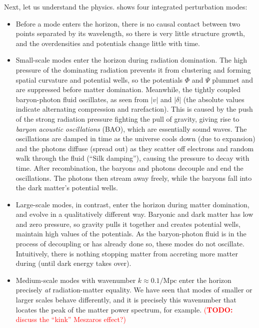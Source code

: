 \documentclass[10pt,a4paper]{article}
\newcommand\TODO[1]{\textcolor{red}{(\textbf{TODO:} #1)}}
\begin{document}
Next, let us understand the physics.
 shows four integrated perturbation modes:
\begin{itemize}
\item
Before a mode enters the horizon,
there is no causal contact between two points separated by its wavelength,
so there is very little structure growth, and the overdensities and potentials change little with time.

\item
Small-scale modes enter the horizon during radiation domination.
The high pressure of the dominating radiation prevents it from clustering and forming spatial curvature and potential wells,
so the potentials $\Phi$ and $\Psi$ plummet and are suppressed before matter domination.
Meanwhile, the tightly coupled baryon-photon fluid oscillates, as seen from $|v|$ and $|\delta|$ (the absolute values indicate alternating compression and rarefaction).
This is caused by the push of the strong radiation pressure fighting the pull of gravity, giving rise to \emph{baryon acoustic oscillations} (BAO), which are essentially sound waves.
The oscillations are damped in time as the universe cools down (due to expansion) and the photons diffuse (spread out) as they scatter off electrons and random walk through the fluid (``Silk damping''), causing the pressure to decay with time.
After recombination, the baryons and photons decouple and end the oscillations.
The photons then stream away freely, while the baryons fall into the dark matter's potential wells.

\item
Large-scale modes, in contrast, enter the horizon during matter domination, and evolve in a qualitatively different way.
Baryonic and dark matter has low and zero pressure,
so gravity pulls it together and creates potential wells, maintain high values of the potentials.
As the baryon-photon fluid is in the process of decoupling or has already done so, these modes do not oscillate.
Intuitively, there is nothing stopping matter from accreting more matter during (until dark energy takes over).

\item
Medium-scale modes with wavenumber $k \approx 0.1 / \textrm{Mpc}$ enter the horizon precisely \emph{at} radiation-matter equality.
We have seen that modes of smaller or larger scales behave differently,
and it is precisely this wavenumber that locates the peak of the matter power spectrum, for example.
\TODO{discuss the ``kink'' Meszaros effect?}


\end{itemize}
\end{document}
